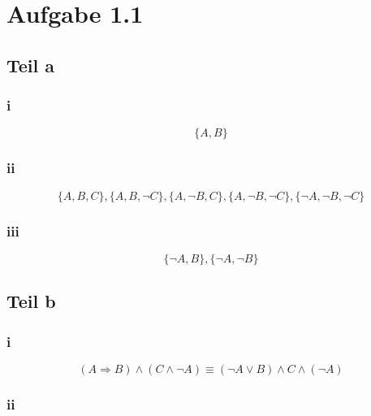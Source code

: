\documentclass[10pt,a4paper]{article}
\begin{document}
\section{Aufgabe 1.1}

\subsection{Teil a}

\subsubsection{i}

\begin{equation}
  \{A, B\}
\end{equation}

\subsubsection{ii}

\begin{equation}
  \{A, B, C\}, \{A, B, \neg C\}, \{A, \neg B, C\}, \{A, \neg B, \neg C\}, \{\neg A, \neg B, \neg C\}
\end{equation}

\subsubsection{iii}

\begin{equation}
  \{\neg A, B\}, \{ \neg A, \neg B \}
\end{equation}

\subsection{Teil b}

\subsubsection{i}

\begin{equation}
  (A \Rightarrow B) \land (C \land \neg A) \equiv (\neg A \lor B) \land C \land (\neg A)
\end{equation}

\subsubsection{ii}
\end{document}
